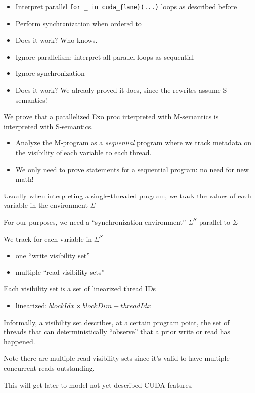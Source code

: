\begin{minipage}[t]{0.5\textwidth}\fixminipage
{}
\begin{itemize}
  \item Interpret parallel \texttt{for \_ in cuda\_\{lane\}(...)} loops as described before
  \item Perform synchronization when ordered to
  \item Does it work? Who knows.
\end{itemize}
\begin{itemize}
  \item Ignore parallelism: interpret all parallel loops as sequential
  \item Ignore synchronization
  \item Does it work? We already proved it does, since the rewrites assume S-semantics!
\end{itemize}
We prove that a parallelized Exo proc interpreted with M-semantics is  interpreted with S-semantics.
\begin{itemize}
  \item Analyze the M-program as a \textit{sequential} program where we track metadata on the visibility of each variable to each thread.
  \item We only need to prove statements for a sequential program: no need for new math!
\end{itemize}
\end{minipage}
\newpage
\begin{minipage}[t]{0.5\textwidth}\fixminipage
{}  %

\vspace{6mm}
Usually when interpreting a single-threaded program, we track the values of each variable in the environment $\Sigma$

For our purposes, we need a ``synchronization environment'' $\Sigma^S$ parallel to $\Sigma$

We track for each variable in $\Sigma^S$
\begin{itemize}
  \item one ``write visibility set''
  \item multiple ``read visibility sets''
\end{itemize}
Each visibility set is a set of linearized thread IDs
\begin{itemize}
  \item linearized: $blockIdx \times blockDim + threadIdx$
\end{itemize}
Informally, a visibility set describes, at a certain program point, the set of threads that can deterministically ``observe'' that a prior write or read has happened.

Note there are multiple read visibility sets since it's valid to have multiple concurrent reads outstanding.

This will get  later to model not-yet-described CUDA features.
\end{minipage}
